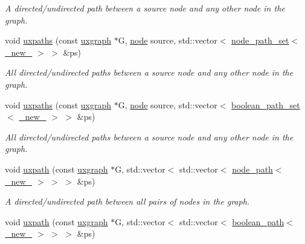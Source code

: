 \begin{DoxyCompactItemize}
\begin{DoxyCompactList}\small\item\em A directed/undirected path between a source node and any other node in the graph. \end{DoxyCompactList}\item 
void \hyperlink{namespacelgraph_1_1traversal_a1dae339c9382f50b0ebaea7d52c87aee}{uxpaths} (const \hyperlink{classlgraph_1_1uxgraph}{uxgraph} $\ast$G, \hyperlink{namespacelgraph_a397169dd66adf725210a30fb7251773e}{node} source, std\-::vector$<$ \hyperlink{namespacelgraph_a0570ce57129123d5816913d287f6cc73}{node\-\_\-path\-\_\-set}$<$ \hyperlink{namespacelgraph_a2836f966c1c36b43da337d8907728ec0}{\-\_\-new\-\_\-} $>$ $>$ \&ps)
\begin{DoxyCompactList}\small\item\em All directed/undirected paths between a source node and any other node in the graph. \end{DoxyCompactList}\item 
void \hyperlink{namespacelgraph_1_1traversal_acac4a7dbf4378142e0d3a58a23716039}{uxpaths} (const \hyperlink{classlgraph_1_1uxgraph}{uxgraph} $\ast$G, \hyperlink{namespacelgraph_a397169dd66adf725210a30fb7251773e}{node} source, std\-::vector$<$ \hyperlink{namespacelgraph_afad432931ba600ab1628d5c9595986c5}{boolean\-\_\-path\-\_\-set}$<$ \hyperlink{namespacelgraph_a2836f966c1c36b43da337d8907728ec0}{\-\_\-new\-\_\-} $>$ $>$ \&ps)
\begin{DoxyCompactList}\small\item\em All directed/undirected paths between a source node and any other node in the graph. \end{DoxyCompactList}\item 
void \hyperlink{namespacelgraph_1_1traversal_a84e2456a95f432086b4179342bbf7a0f}{uxpath} (const \hyperlink{classlgraph_1_1uxgraph}{uxgraph} $\ast$G, std\-::vector$<$ std\-::vector$<$ \hyperlink{classlgraph_1_1node__path}{node\-\_\-path}$<$ \hyperlink{namespacelgraph_a2836f966c1c36b43da337d8907728ec0}{\-\_\-new\-\_\-} $>$ $>$ $>$ \&ps)
\begin{DoxyCompactList}\small\item\em A directed/undirected path between all pairs of nodes in the graph. \end{DoxyCompactList}\item 
void \hyperlink{namespacelgraph_1_1traversal_ac2f98cd03640c664ef13e752bf440180}{uxpath} (const \hyperlink{classlgraph_1_1uxgraph}{uxgraph} $\ast$G, std\-::vector$<$ std\-::vector$<$ \hyperlink{classlgraph_1_1boolean__path}{boolean\-\_\-path}$<$ \hyperlink{namespacelgraph_a2836f966c1c36b43da337d8907728ec0}{\-\_\-new\-\_\-} $>$ $>$ $>$ \&ps)

\end{DoxyCompactItemize}
